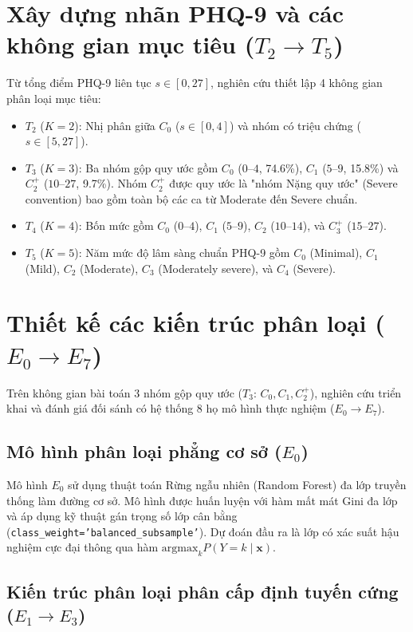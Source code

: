 \section{Xây dựng nhãn PHQ-9 và các không gian mục tiêu ($T_2 \to T_5$)}
\label{sec:nhan-muc-tieu}

Từ tổng điểm PHQ-9 liên tục $s \in [0, 27]$, nghiên cứu thiết lập 4 không gian phân loại mục tiêu:
\begin{itemize}
    \item $T_2$ ($K=2$): Nhị phân giữa $C_0$ ($s \in [0, 4]$) và nhóm có triệu chứng ($s \in [5, 27]$).
    \item $T_3$ ($K=3$): Ba nhóm gộp quy ước gồm $C_0$ ($0$--$4$, 74.6\%), $C_1$ ($5$--$9$, 15.8\%) và $C_2^+$ ($10$--$27$, 9.7\%). Nhóm $C_2^+$ được quy ước là "nhóm Nặng quy ước" (Severe convention) bao gồm toàn bộ các ca từ Moderate đến Severe chuẩn.
    \item $T_4$ ($K=4$): Bốn mức gồm $C_0$ ($0$--$4$), $C_1$ ($5$--$9$), $C_2$ ($10$--$14$), và $C_3^+$ ($15$--$27$).
    \item $T_5$ ($K=5$): Năm mức độ lâm sàng chuẩn PHQ-9 gồm $C_0$ (Minimal), $C_1$ (Mild), $C_2$ (Moderate), $C_3$ (Moderately severe), và $C_4$ (Severe).
\end{itemize}

\section{Thiết kế các kiến trúc phân loại ($E_0 \to E_7$)}
\label{sec:thiet-ke-kien-truc-mo-hinh}

Trên không gian bài toán 3 nhóm gộp quy ước ($T_3$: $C_0, C_1, C_2^+$), nghiên cứu triển khai và đánh giá đối sánh có hệ thống 8 họ mô hình thực nghiệm ($E_0 \to E_7$).

\subsection{Mô hình phân loại phẳng cơ sở ($E_0$)}
\label{subsec:e0-flat}

Mô hình $E_0$ sử dụng thuật toán Rừng ngẫu nhiên (Random Forest) đa lớp truyền thống làm đường cơ sở. Mô hình được huấn luyện với hàm mất mát Gini đa lớp và áp dụng kỹ thuật gán trọng số lớp cân bằng (\texttt{class\_weight='balanced\_subsample'}). Dự đoán đầu ra là lớp có xác suất hậu nghiệm cực đại thông qua hàm $\text{argmax}_k P(Y=k \mid \mathbf{x})$.

\subsection{Kiến trúc phân loại phân cấp định tuyến cứng ($E_1 \to E_3$)}
\label{subsec:hard-hierarchical}

